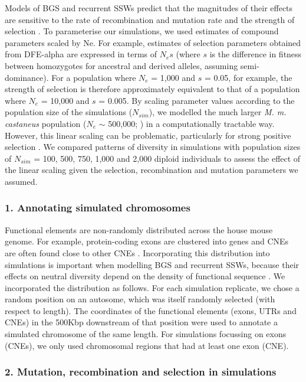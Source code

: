 Models of BGS and recurrent SSWs predict that the magnitudes of their effects are sensitive to the rate of recombination and mutation rate and the strength of selection \citep{RN277, RN157, RN226}. To parameterise our simulations, we used estimates of compound parameters scaled by Ne. For example, estimates of selection parameters obtained from DFE-alpha are expressed in terms of $N_es$ (where $s$ is the difference in fitness between homozygotes for ancestral and derived alleles, assuming semi-dominance). For a population where $N_e$ = 1,000 and $s$ = 0.05, for example, the strength of selection is therefore approximately equivalent to that of a population where $N_e$ = 10,000 and $s$ = 0.005. By scaling parameter values according to the population size of the simulations ($N_{sim}$), we modelled the much larger \textit{M. m. castaneus} population ($N_e$ $\sim$ 500,000; \citealt{RN315}) in a computationally tractable way. However, this linear scaling can be problematic, particularly for strong positive selection \citep{RN198}. We compared patterns of diversity in simulations with population sizes of $N_{sim}$ = 100, 500, 750, 1,000 and 2,000 diploid individuals to assess the effect of the linear scaling given the selection, recombination and mutation parameters we assumed.

\subsubsection{1. Annotating simulated chromosomes}

	Functional elements are non-randomly distributed across the house mouse genome. For example, protein-coding exons are clustered into genes and CNEs are often found close to other CNEs \citep{RN122}. Incorporating this distribution into simulations is important when modelling BGS and recurrent SSWs, because their effects on neutral diversity depend on the density of functional sequence \citep{RN157,RN290}. We incorporated the distribution as follows. For each simulation replicate, we chose a random position on an autosome, which was itself randomly selected (with respect to length). The coordinates of the functional elements (exons, UTRs and CNEs) in the 500Kbp downstream of that position were used to annotate a simulated chromosome of the same length. For simulations focussing on exons (CNEs), we only used chromosomal regions that had at least one exon (CNE).

\subsubsection{2. Mutation, recombination and selection in simulations}
 
